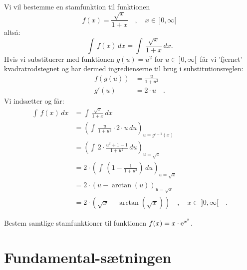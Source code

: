 \begin{example}[Substitution]\label{exampSubst}
Vi vil bestemme en stamfunktion til funktionen
\begin{equation}
f(x) = \frac{\sqrt{x}}{1+x} \quad , \quad x \in \, ]0, \infty[\,
\end{equation}
altså:
\begin{equation}
\int\,f(x) \, dx  = \int\,\frac{\sqrt{x}}{1+x} \, dx .
\end{equation}
Hvis vi substituerer med funktionen $g(u) = u^{2}$ for $u \in \, ]0, \infty[ \, $ får vi 'fjernet' kvadratrodstegnet og har dermed ingredienserne til brug i substitutionsreglen:
\begin{equation}
\begin{aligned}
f(g(u)) &= \frac{u}{1+u^{2}} \\
g'(u) &= 2\cdot u \quad .
\end{aligned}
\end{equation}
Vi indsætter og får:
\begin{equation}
\begin{aligned}
\int\,f(x) \, dx  &= \int\,\frac{\sqrt{x}}{1+x} \, dx \\
&= \left( \int \,\frac{u}{1+u^{2}}\cdot 2\cdot u \, du \right)_{u = g^{\circ -1}(x)} \\
&= \left( \int \,2\cdot \frac{u^{2} + 1 - 1}{1+u^{2}} \, du \right)_{u = \sqrt{x}} \\
&= 2\cdot\left( \int \, \left(1 - \frac{1}{1+u^{2}} \right)\, du \right)_{u = \sqrt{x}} \\
&= 2 \cdot \left( u - \arctan(u) \right)_{u = \sqrt{x}} \\
&= 2\cdot \left( \sqrt{x} - \arctan(\sqrt{x}) \right) \quad , \quad x \in \, ]0, \infty[ \quad .
\end{aligned}
\end{equation}
\end{example}

\begin{exercise} \label{exercExp2}
Bestem samtlige stamfunktioner til funktionen $f(x) = x\cdot\mathrm{e}^{x^{2}}$.
\end{exercise}




\section{Fundamental-sætningen}\label{secFundamI}


